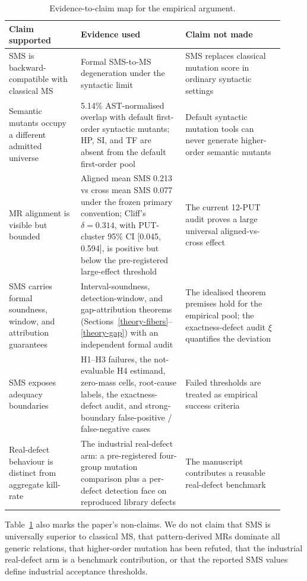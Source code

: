 \documentclass[manuscript,screen,review]{acmart}
\begin{document}
\begin{table}[t]
\caption{Evidence-to-claim map for the empirical argument.}
\label{tab:claim-evidence-map}
\centering
\small
\begin{tabular}{p{0.24\linewidth}p{0.35\linewidth}p{0.33\linewidth}}
\toprule
Claim supported & Evidence used & Claim not made \\
\midrule
SMS is backward-compatible with classical MS & Formal SMS-to-MS
degeneration under the syntactic limit & SMS replaces classical mutation
score in ordinary syntactic settings \\
Semantic mutants occupy a different admitted universe & 5.14\%
AST-normalised overlap with default first-order syntactic mutants;
HP, SI, and TF are absent from the default first-order pool & Default
syntactic mutation tools can never generate higher-order semantic
mutants \\
MR alignment is visible but bounded & Aligned mean SMS 0.213 vs
cross mean SMS 0.077 under the frozen primary convention; Cliff's
\(\delta=0.314\), with PUT-cluster 95\% CI [0.045, 0.594], is positive
but below the pre-registered large-effect threshold & The current 12-PUT audit proves
a large universal aligned-vs-cross effect \\
SMS carries formal soundness, window, and attribution guarantees &
Interval-soundness, detection-window, and gap-attribution theorems
(Sections~\ref{theory-fibers}--\ref{theory-gap}) with an independent
formal audit & The idealised theorem premises hold for the empirical
pool; the exactness-defect audit \(\xi\) quantifies the deviation \\
SMS exposes adequacy boundaries & H1--H3 failures, the not-evaluable H4
estimand, zero-mass cells,
root-cause labels, the exactness-defect audit, and strong-boundary
false-positive / false-negative
cases & Failed thresholds are treated as empirical success criteria \\
Real-defect behaviour is distinct from aggregate kill-rate & The
industrial real-defect arm: a pre-registered four-group mutation
comparison plus a per-defect detection face on reproduced library
defects & The manuscript contributes a reusable
real-defect benchmark \\
\bottomrule
\end{tabular}
\normalsize
\end{table}

Table~\ref{tab:claim-evidence-map} also marks the paper's non-claims. We do not claim that SMS
is universally superior to classical MS, that pattern-derived MRs
dominate all generic relations, that higher-order mutation has been
refuted, that the industrial real-defect arm is a benchmark contribution, or that
the reported SMS values define industrial acceptance thresholds.
\end{document}

